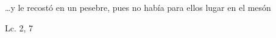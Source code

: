 \documentclass[../../rosario.tex]{subfiles}
\begin{document}
    \ldots y le recostó en un pesebre, pues no había para ellos lugar en el mesón      
    \begin{flushright}
    Lc. 2, 7         
    \end{flushright}
\end{document}
